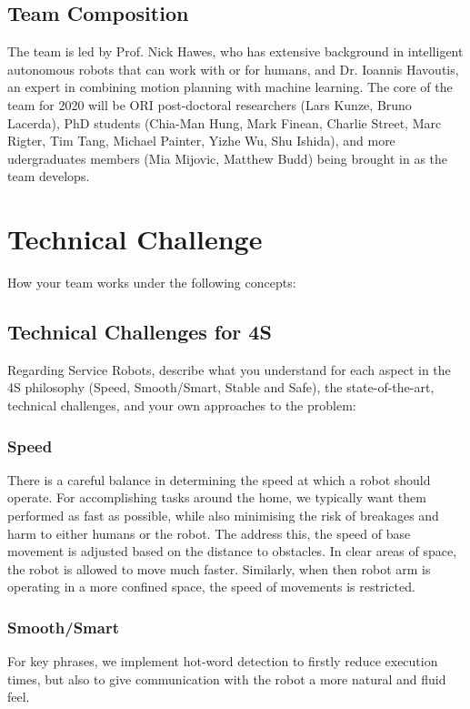 \documentclass[runningheads,a4paper]{llncs}
\begin{document}
\subsection{Team Composition}

The team is led by Prof. Nick Hawes, who has extensive background in
intelligent autonomous robots that can work with or for humans, and Dr. Ioannis Havoutis, an expert in combining motion planning with machine learning. The core of the team for 2020 will be ORI post-doctoral researchers (Lars Kunze, Bruno Lacerda), PhD students (Chia-Man Hung, Mark Finean, Charlie Street, Marc Rigter, Tim Tang, Michael Painter, Yizhe Wu, Shu Ishida), and more udergraduates members (Mia Mijovic, Matthew Budd) being brought in as the team develops. 

\section{Technical Challenge}
How your team works under the following concepts:
\subsection{Technical Challenges for 4S }
 Regarding Service Robots, describe what you understand for each aspect in the 4S philosophy (Speed, Smooth/Smart, Stable and Safe), the state-of-the-art, technical challenges, and your own approaches to the problem:

\subsubsection{Speed}
There is a careful balance in determining the speed at which a robot should operate. For accomplishing tasks around the home, we typically want them performed as fast as possible, while also minimising the risk of breakages and harm to either humans or the robot. The address this, the speed of base movement is adjusted based on the distance to obstacles. In clear areas of space, the robot is allowed to move much faster. Similarly, when then robot arm is operating in a more confined space, the speed of movements is restricted.

\subsubsection{Smooth/Smart}
For key phrases, we implement hot-word detection to firstly reduce execution times, but also to give communication with the robot a more natural and fluid feel. 
\end{document}
